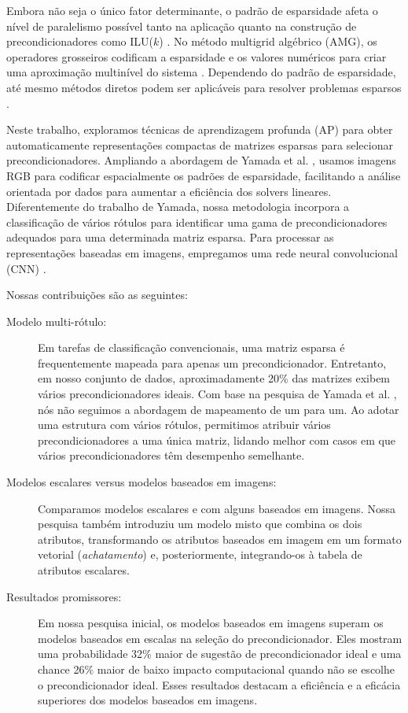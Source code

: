 \documentclass{pssbmac}
\begin{document}
Embora não seja o único fator determinante, o padrão de esparsidade afeta o 
nível de paralelismo possível tanto na aplicação quanto na construção de precondicionadores 
como ILU($k$) \cite{Meijerink1977AnIS, saad2003iterative}. No método multigrid algébrico (AMG),
os operadores grosseiros codificam a esparsidade e os valores numéricos para criar 
uma aproximação multinível do sistema \cite{stuben2001AReview}. Dependendo do padrão 
de esparsidade, até mesmo métodos diretos podem ser aplicáveis para resolver 
problemas esparsos \cite{Davis2016ASO}.

Neste trabalho, exploramos técnicas de aprendizagem profunda (AP) para obter 
automaticamente representações compactas de matrizes esparsas para selecionar 
precondicionadores. Ampliando a abordagem de Yamada et al. \cite{yamada2018preconditioner}, 
usamos imagens RGB para codificar espacialmente os padrões de esparsidade, 
facilitando a análise orientada por dados para aumentar a eficiência dos solvers lineares. 
Diferentemente do trabalho de Yamada, nossa metodologia incorpora a classificação 
de vários rótulos para identificar uma gama de precondicionadores adequados 
para uma determinada matriz esparsa. Para processar as representações baseadas 
em imagens, empregamos uma rede neural convolucional (CNN) \cite{li2022survey}.

Nossas contribuições são as seguintes: 
 \begin{description}  
\item [Modelo multi-rótulo:] Em tarefas de classificação convencionais, 
uma matriz esparsa é frequentemente mapeada para apenas um precondicionador. 
Entretanto, em nosso conjunto de dados, aproximadamente 20\% das matrizes exibem 
vários precondicionadores ideais. Com base na pesquisa de Yamada et al.
\cite{yamada2018preconditioner}, nós não seguimos a abordagem de mapeamento de um para um. 
Ao adotar uma estrutura com vários rótulos, permitimos atribuir vários precondicionadores 
a uma única matriz, lidando melhor com casos em que vários precondicionadores têm desempenho 
semelhante.  
\item [Modelos escalares versus modelos baseados em imagens:] Comparamos modelos escalares 
e com alguns baseados em imagens. Nossa pesquisa também introduziu um modelo misto que combina 
os dois atributos, transformando os atributos baseados em imagem em um formato 
vetorial (\emph{achatamento}) e, posteriormente, integrando-os à tabela de atributos escalares.  
\item[Resultados promissores:] Em nossa pesquisa inicial, os modelos baseados em imagens 
superam os modelos baseados em escalas na seleção do precondicionador. Eles mostram 
uma probabilidade 32\% maior de sugestão de precondicionador ideal e uma chance 26\% maior 
de baixo impacto computacional quando não se escolhe o precondicionador ideal. Esses 
resultados destacam a eficiência e a eficácia superiores dos modelos baseados em imagens.  
\end{description}
\end{document}
